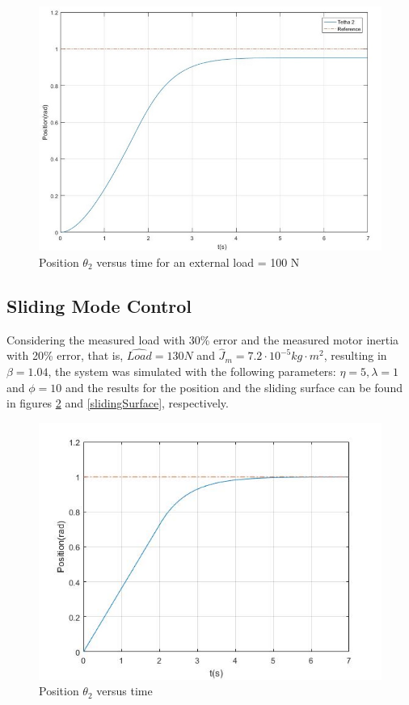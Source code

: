    \begin{figure}[thpb]
      \centering
      \includegraphics[scale=0.5]{Images/posicao_load_100_paper.jpg}
      \caption{Position \(\theta_2\) versus time for an external load = 100 N}
      \label{posicao100}
   \end{figure}

\subsection{Sliding Mode Control}

Considering the measured load with 30\% error and the measured motor inertia with 20\% error, that is, \(\hat{Load} = 130N\) and \(\hat{J}_m = 7.2 \cdot 10^{-5} kg \cdot m^2\), resulting in \(\beta = 1.04\), the system was simulated with the following parameters: \(\eta = 5, \lambda = 1\) and \(\phi = 10\) and the results for the position and the sliding surface can be found in figures \ref{posicaoSliding} and \ref{slidingSurface}, respectively.

\begin{figure}[thpb]
      \centering
      \includegraphics[scale=0.5]{Images/Sliding_mode_position.jpg}
      \caption{Position \(\theta_2\) versus time}
      \label{posicaoSliding}
   \end{figure}
   
